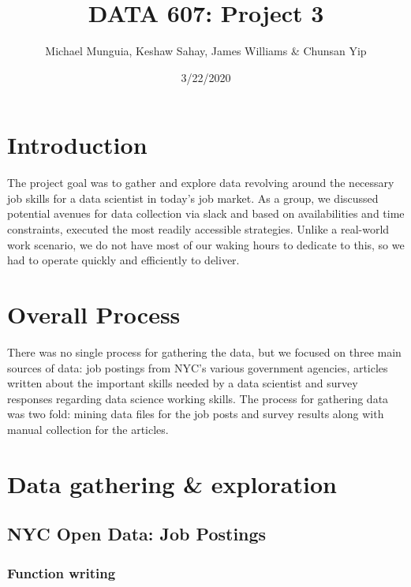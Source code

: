 \documentclass[]{article}
\title{DATA 607: Project 3}
\author{Michael Munguia, Keshaw Sahay, James Williams \& Chunsan Yip}
\date{3/22/2020}
\begin{document}
\maketitle

\hypertarget{introduction}{%
\section{Introduction}\label{introduction}}

The project goal was to gather and explore data revolving around the
necessary job skills for a data scientist in today's job market. As a
group, we discussed potential avenues for data collection via slack and
based on availabilities and time constraints, executed the most readily
accessible strategies. Unlike a real-world work scenario, we do not have
most of our waking hours to dedicate to this, so we had to operate
quickly and efficiently to deliver.

\hypertarget{overall-process}{%
\section{Overall Process}\label{overall-process}}

There was no single process for gathering the data, but we focused on
three main sources of data: job postings from NYC's various government
agencies, articles written about the important skills needed by a data
scientist and survey responses regarding data science working skills.
The process for gathering data was two fold: mining data files for the
job posts and survey results along with manual collection for the
articles.

\hypertarget{data-gathering-exploration}{%
\section{Data gathering \&
exploration}\label{data-gathering-exploration}}

\hypertarget{nyc-open-data-job-postings}{%
\subsection{NYC Open Data: Job
Postings}\label{nyc-open-data-job-postings}}

\hypertarget{function-writing}{%
\subsubsection{Function writing}\label{function-writing}}
\end{document}
